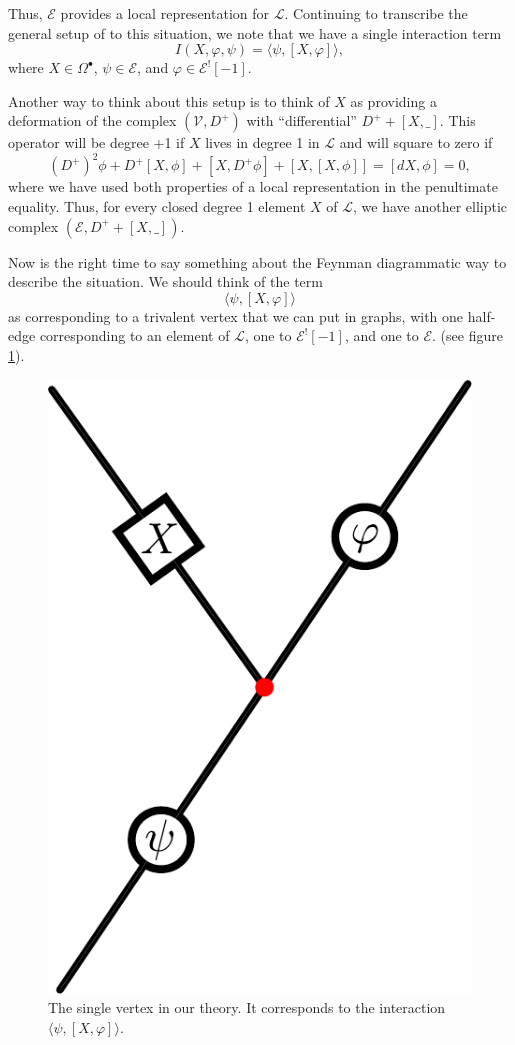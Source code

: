 \documentclass[11pt]{amsart}
\newcommand{\E}{\mscr{E}}
\newcommand{\mscr}{\mathscr}
\numberwithin{equation}{section}
\renewcommand{\L}{\mathscr{L}}
\begin{document}
Thus, $\E$ provides a local representation for $\L$. Continuing to transcribe the general setup of \cite{ref: othesis} to this situation, we note that we have a single interaction term
\[
I(X,\varphi,\psi)=\langle \psi , [X,\varphi]\rangle,
\]
where $X\in \Omega^\bullet$, $\psi \in \E$, and $\varphi \in \E^![-1]$.

Another way to think about this setup is to think of $X$ as providing a deformation of the complex $(\mathscr V,D^+)$ with ``differential'' $D^++[X,\_]$. This operator will be degree +1 if $X$ lives in degree 1 in $\mathscr L$ and will square to zero if
\[
(D^+)^2\phi +D^+[X,\phi] +[X,D^+\phi]+[X,[X,\phi]]=[dX,\phi]=0,
\]
where we have used both properties of a local representation in the penultimate equality. Thus, for every closed degree 1 element $X$ of $\L$, we have another elliptic complex $(\E,D^++[X,\_])$.

Now is the right time to say something about the Feynman diagrammatic way to describe the situation. We should think of the term 
\[
\langle \psi, [X,\varphi]\rangle 
\]
as corresponding to a trivalent vertex that we can put in graphs, with one half-edge corresponding to an element of $\L$, one to $\E^![-1]$, and one to $\E$.  (see figure \ref{fig: vertex}).

\begin{figure}[h]
	\label{fig: vertex}
	\includegraphics[scale = .50]{Vertex}
	\caption{The single vertex in our theory. It corresponds to the interaction $\langle \psi, [X,\varphi]\rangle$.}
\end{figure}
\end{document}
